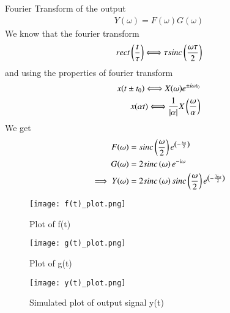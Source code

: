 \documentclass[journal,12pt,twocolumn]{IEEEtran}
\begin{document}
Fourier Transform of the output
\begin{align}
    Y(\omega)=F(\omega)G(\omega)
\end{align}
We know that the fourier transform
\begin{align}
    rect\left(\frac{t}{\tau}\right)\Longleftrightarrow \tau sinc\left(\frac{\omega \tau}{2}\right)
\end{align}
and using the properties of fourier transform
\begin{align}
    x(t\pm t_0)\Longleftrightarrow X(\omega)e^{\pm i\omega t_0}\\
    x(\alpha t)\Longleftrightarrow \frac{1}{|\alpha|}X\left(\frac{\omega}{\alpha}\right)
\end{align}
We get
\begin{align}
    F(\omega) &= sinc\left(\frac{\omega}{2}\right)e^{\left(- \frac{i\omega}{2}\right)}\\
    G(\omega) &= 2sinc\left(\omega\right)e^{-i\omega}\\
    \implies Y(\omega) &= 2sinc\left(\omega\right)sinc\left(\frac{\omega}{2}\right)e^{\left(- \frac{3i\omega}{2}\right)}
\end{align}
\begin{figure}[!ht]
    \centering
    \texttt{[image: f(t)\_plot.png]}
    \caption{Plot of f(t)}
    \label{plot}
\end{figure}
\begin{figure}[!ht]
    \centering
    \texttt{[image: g(t)\_plot.png]}
    \caption{Plot of g(t)}
    \label{plot}
\end{figure}
\begin{figure}[!ht]
    \centering
    \texttt{[image: y(t)\_plot.png]}
    \caption{Simulated plot of output signal y(t)}
    \label{plot}
\end{figure}
\end{document}
